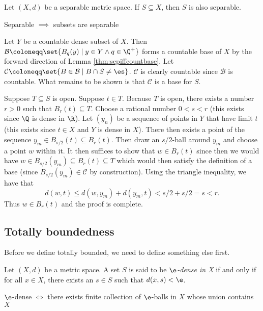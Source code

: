 \documentclass[class=article, crop=false]{standalone}
\begin{document}
\begin{thm}
    Let $(X,d)$ be a separable metric space. If $S \subseteq X$, then $S$ is also separable.
\end{thm}
\begin{slogan}
    Separable $\implies$ subsets are separable
\end{slogan}
\begin{pf}
    Let $Y$ be a countable dense subset of $X$. Then $\mathcal B \coloneqq \set{B_q(y) \mid y \in Y \land q \in \Q^+}$ forms a countable base of $X$ by the forward direction of Lemma \ref{thm:sepiffcountbase}. Let $\mathcal C \coloneqq \set{B \in \mathcal B \mid B \cap S \neq \es}$. $\mathcal C$ is clearly countable since $\mathcal B$ is countable. What remains to be shown is that $\mathcal C$ is a base for $S$.

    Suppose $T \subseteq S$ is open. Suppose $t \in T$. Because $T$ is open, there exists a number $r > 0$ such that $B_r(t) \subseteq T$. Choose a rational number $0 < s <r$ (this exists since $\Q$ is dense in $\R$). Let $(y_n)$ be a sequence of points in $Y$ that have limit $t$ (this exists since $t \in X$ and $Y$ is dense in $X$). There then exists a point of the sequence $y_m \in B_{s/2}(t) \subseteq B_r(t)$. Then draw an $s/2$-ball around $y_m$ and choose a point $w$ within it.
    It then suffices to show that $w \in B_r(t)$ since then we would have $w \in B_{s/2}(y_m) \subseteq B_r(t) \subseteq T$ which would then satisfy the definition of a base (since $B_{s/2}(y_m) \in \mathcal C$ by construction). Using the triangle inequality, we have that
        \[
            d(w,t) \leq d(w,y_m) + d(y_m,t) < s/2 + s/2 =s < r.
        \]
    Thus $w \in B_r(t)$ and the proof is complete.
\end{pf}











\subsection{Totally boundedness}

Before we define totally bounded, we need to define something else first.

\begin{defn}
    Let $(X,d)$ be a metric space. A set $S$ is said to be \textit{$\e$-dense in X} if and only if for all $x \in X$, there exists an $s \in S$ such that $d(x,s) < \e$.
\end{defn}
\begin{slogan}
    $\e$-dense $\iff$ there exists finite collection of $\e$-balls in $X$ whose union contains $X$
\end{slogan}
\end{document}
